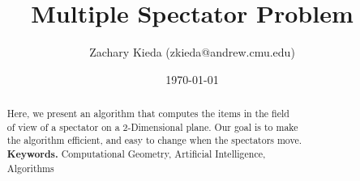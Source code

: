 \documentclass[11pt]{article}
\begin{document}
\title{Multiple Spectator Problem}
\author{Zachary Kieda (zkieda@andrew.cmu.edu)}
\date{\today}
\maketitle

\begin{abstract}
\setlength\parindent{0pt}
\noindent 
Here, we present an algorithm that computes the items in the field\\ 
of view of a spectator on a 2-Dimensional plane. Our goal is to make\\
the algorithm efficient, and easy to change when the spectators move.\\

\textbf{Keywords.} Computational Geometry, Artificial Intelligence, \\Algorithms
\end{abstract}
\end{document}
